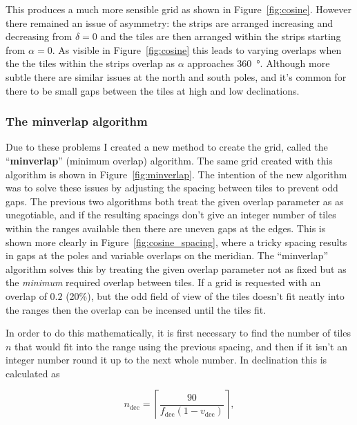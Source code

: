 \begin{colsection}
\begin{colsection}
This produces a much more sensible grid as shown in Figure~\ref{fig:cosine}. However there remained an issue of asymmetry: the strips are arranged increasing and decreasing from $\delta=0$ and the tiles are then arranged within the strips starting from $\alpha=0$. As visible in Figure~\ref{fig:cosine} this leads to varying overlaps when the the tiles within the strips overlap as $\alpha$ approaches \SI{360}{\degree}. Although more subtle there are similar issues at the north and south poles, and it's common for there to be small gaps between the tiles at high and low declinations.

\subsubsection{The minverlap algorithm}

Due to these problems I created a new method to create the grid, called the ``\textbf{minverlap}'' (minimum overlap) algorithm. The same grid created with this algorithm is shown in Figure~\ref{fig:minverlap}. The intention of the new algorithm was to solve these issues by adjusting the spacing between tiles to prevent odd gaps. The previous two algorithms both treat the given overlap parameter as as unegotiable, and if the resulting spacings don't give an integer number of tiles within the ranges available then there are uneven gaps at the edges. This is shown more clearly in Figure~\ref{fig:cosine_spacing}, where a tricky spacing results in gaps at the poles and variable overlaps on the meridian. The ``minverlap'' algorithm solves this by treating the given overlap parameter not as fixed but as the \textit{minimum} required overlap between tiles. If a grid is requested with an overlap of $0.2$ (20\%), but the odd field of view of the tiles doesn't fit neatly into the ranges then the overlap can be incensed until the tiles fit.

In order to do this mathematically, it is first necessary to find the number of tiles $n$ that would fit into the range using the previous spacing, and then if it isn't an integer number round it up to the next whole number. In declination this is calculated as

\begin{equation}
    n_\text{dec} = \left \lceil \frac{90}{f_\text{dec}(1-v_\text{dec})} \right \rceil,
    \label{eq:minverlap_ndec}
\end{equation}


\end{colsection}
\end{colsection}
